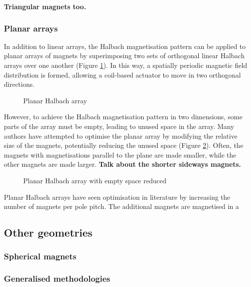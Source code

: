 \textbf{Triangular magnets too.}

\subsubsection*{Planar arrays}
In addition to linear arrays, the Halbach magnetisation pattern can be applied to planar arrays of magnets by superimposing two sets of orthogonal linear Halbach arrays over one another (Figure \ref{fig:planarHalbachArray}). In this way, a spatially periodic magnetic field distribution is formed, allowing a coil-based actuator to move in two orthogonal directions.
\begin{figure}
    \centering
    \vspace{5cm}
    \caption{Planar Halbach array}
    \label{fig:planarHalbachArray}
\end{figure}
However, to achieve the Halbach magnetisation pattern in two dimensions, some parts of the array must be empty, leading to unused space in the array. Many authors have attempted to optimise the planar array by modifying the relative size of the magnets, potentially reducing the unused space (Figure \ref{fig:planarHalbachArrayModifiedPoles}). Often, the magnets with magnetisations parallel to the plane are made smaller, while the other magnets are made larger. \textbf{Talk about the shorter sideways magnets.}
\begin{figure}
    \centering
    \vspace{5cm}
    \caption{Planar Halbach array with empty space reduced}
    \label{fig:planarHalbachArrayModifiedPoles}
\end{figure}

Planar Halbach arrays have seen optimisation in literature by increasing the number of magnets per pole pitch. The additional magnets are magnetised in a 

\subsection{Other geometries}

\subsubsection*{Spherical magnets}

\subsubsection*{Generalised methodologies}

